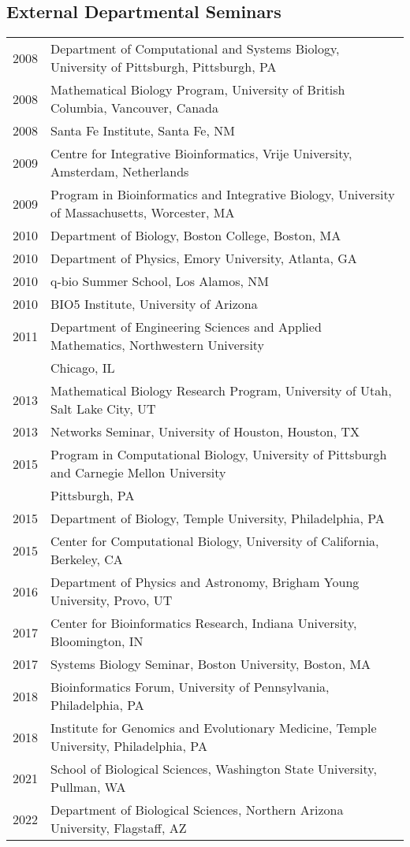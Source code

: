 \documentclass[11pt]{article}
\begin{document}
\subsection*{External Departmental Seminars}
\begin{longtable}[l]{l l}
2008 & Department of Computational and Systems Biology, University of Pittsburgh, Pittsburgh, PA\\
2008 & Mathematical Biology Program, University of British Columbia, Vancouver, Canada \\
2008 & Santa Fe Institute, Santa Fe, NM\\
2009 & Centre for Integrative Bioinformatics, Vrije University, Amsterdam, Netherlands\\
2009 & Program in Bioinformatics and Integrative Biology, University of Massachusetts, Worcester, MA\\
2010 & Department of Biology, Boston College, Boston, MA\\
2010 & Department of Physics, Emory University, Atlanta, GA\\
2010 & q-bio Summer School, Los Alamos, NM\\
2010 & BIO5 Institute, University of Arizona\\
2011 & Department of Engineering Sciences and Applied Mathematics, Northwestern University\\
& Chicago, IL\\
2013 & Mathematical Biology Research Program, University of Utah, Salt Lake City, UT\\
2013 & Networks Seminar, University of Houston, Houston, TX\\
2015 & Program in Computational Biology, University of Pittsburgh and Carnegie Mellon University\\
& Pittsburgh, PA\\
2015 & Department of Biology, Temple University, Philadelphia, PA\\
2015 & Center for Computational Biology, University of California, Berkeley, CA\\
2016 & Department of Physics and Astronomy, Brigham Young University, Provo, UT\\
2017 & Center for Bioinformatics Research, Indiana University, Bloomington, IN\\
2017 & Systems Biology Seminar, Boston University, Boston, MA\\
2018 & Bioinformatics Forum, University of Pennsylvania, Philadelphia, PA\\
2018 & Institute for Genomics and Evolutionary Medicine, Temple University, Philadelphia, PA\\
2021 & School of Biological Sciences, Washington State University, Pullman, WA\\
2022 & Department of Biological Sciences, Northern Arizona University, Flagstaff, AZ\\
\end{longtable}
\end{document}
